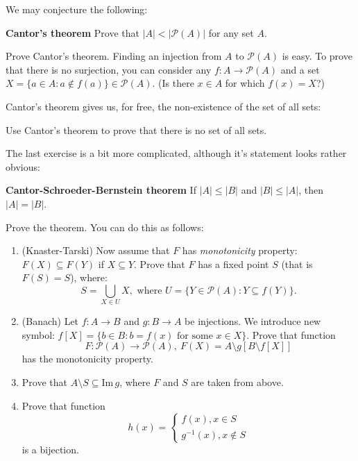 We may conjecture the following:

\begin{theorem}
\textbf{Cantor's theorem} Prove that $|A| < \left|\mathcal P(A)\right|$ for any set $A$.
\end{theorem}

\begin{exercise}
	Prove Cantor's theorem. Finding an injection from $A$ to $\mathcal P(A)$ is easy. To prove that there is no surjection, you can consider any $f:A\to \mathcal P(A)$ and a set $X=\{a\in A : a\notin f(a)\}\in \mathcal P(A)$. (Is there $x\in A$ for which $f(x)=X$?)
\end{exercise}

Cantor's theorem gives us, for free, the non-existence of the set of all sets:

\begin{exercise}
	Use Cantor's theorem to prove that there is no set of all sets.
\end{exercise}

The last exercise is a bit more complicated, although it's statement looks rather obvious:

\begin{theorem}
	\textbf{Cantor-Schroeder-Bernstein theorem} If $|A|\le|B|$ and $|B|\le |A|$, then $|A|=|B|$.
\end{theorem}

\begin{exercise}
    Prove the theorem. You can do this as follows:
	\begin{enumerate}
		\item (Knaster-Tarski) Now assume that $F$ has \textit{monotonicity} property: $F(X)\subseteq F(Y)$ if $X\subseteq Y$.
			Prove that $F$ has a fixed point $S$ (that is $F(S)=S$), where:
			$$S=\bigcup_{X\in U} X, \text{~where~} U= \{Y\in \mathcal P(A) : Y\subseteq f(Y)\}.$$
		\item (Banach) Let $f: A\to B$ and $g:B\to A$ be injections.
			We introduce new symbol: $f[X]=\{b\in B : b=f(x) \text{ for some } x\in X\}$. Prove that
			function $$F:\mathcal P(A)\to \mathcal P(A),~F(X)=A\setminus g[B\setminus f[X]]$$
			has the monotonicity property.
    \item Prove that $A\setminus S\subseteq \text{Im}\,g$, where
      $F$ and $S$ are taken from above.
		\item Prove that function
			$$h(x) =
				\begin{cases}
					f(x), x\in S\\
					g^{-1}(x), x \notin S
				\end{cases}
			 $$
			 is a bijection.
	\end{enumerate}
\end{exercise}
